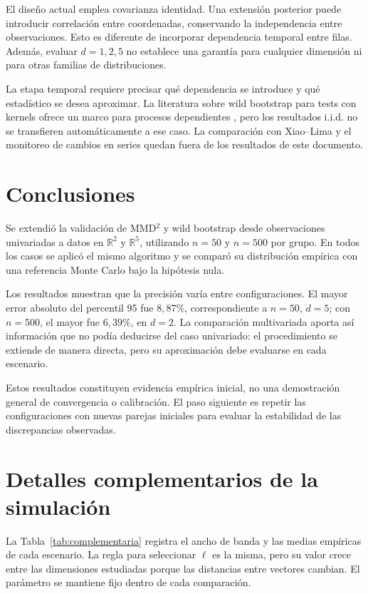 \documentclass[11pt,a4paper]{article}
\newcommand{\R}{\mathbb{R}}
\begin{document}
El diseño actual emplea covarianza identidad. Una extensión posterior puede introducir correlación entre coordenadas, conservando la independencia entre observaciones. Esto es diferente de incorporar dependencia temporal entre filas. Además, evaluar $d=1,2,5$ no establece una garantía para cualquier dimensión ni para otras familias de distribuciones.

La etapa temporal requiere precisar qué dependencia se introduce y qué estadístico se desea aproximar. La literatura sobre wild bootstrap para tests con kernels ofrece un marco para procesos dependientes \cite{chwialkowski2014}, pero los resultados i.i.d. no se transfieren automáticamente a ese caso. La comparación con Xiao--Lima y el monitoreo de cambios en series quedan fuera de los resultados de este documento.

\section{Conclusiones}
Se extendió la validación de MMD$^2$ y wild bootstrap desde observaciones univariadas a datos en $\R^2$ y $\R^5$, utilizando $n=50$ y $n=500$ por grupo. En todos los casos se aplicó el mismo algoritmo y se comparó su distribución empírica con una referencia Monte Carlo bajo la hipótesis nula.

Los resultados muestran que la precisión varía entre configuraciones. El mayor error absoluto del percentil 95 fue $8{,}87\%$, correspondiente a $n=50$, $d=5$; con $n=500$, el mayor fue $6{,}39\%$, en $d=2$. La comparación multivariada aporta así información que no podía deducirse del caso univariado: el procedimiento se extiende de manera directa, pero su aproximación debe evaluarse en cada escenario.

Estos resultados constituyen evidencia empírica inicial, no una demostración general de convergencia o calibración. El paso siguiente es repetir las configuraciones con nuevas parejas iniciales para evaluar la estabilidad de las discrepancias observadas.

\clearpage



\clearpage
\appendix
\section{Detalles complementarios de la simulación}\label{anexo:detalles}
La Tabla~\ref{tab:complementaria} registra el ancho de banda y las medias empíricas de cada escenario. La regla para seleccionar $\ell$ es la misma, pero su valor crece entre las dimensiones estudiadas porque las distancias entre vectores cambian. El parámetro se mantiene fijo dentro de cada comparación.
\end{document}
